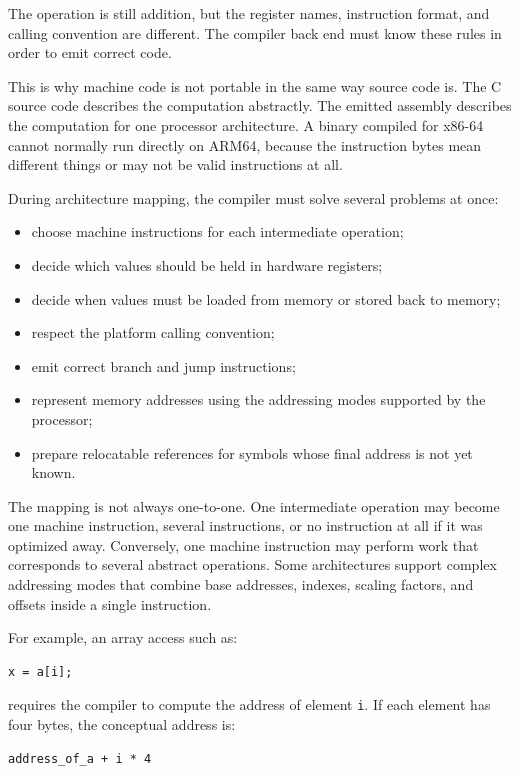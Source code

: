 The operation is still addition, but the register names, instruction format, and calling convention are different. The compiler back end must know these rules in order to emit correct code.

This is why machine code is not portable in the same way source code is. The C source code describes the computation abstractly. The emitted assembly describes the computation for one processor architecture. A binary compiled for x86-64 cannot normally run directly on ARM64, because the instruction bytes mean different things or may not be valid instructions at all.

During architecture mapping, the compiler must solve several problems at once:

\begin{itemize}
    \item choose machine instructions for each intermediate operation;
    \item decide which values should be held in hardware registers;
    \item decide when values must be loaded from memory or stored back to memory;
    \item respect the platform calling convention;
    \item emit correct branch and jump instructions;
    \item represent memory addresses using the addressing modes supported by the processor;
    \item prepare relocatable references for symbols whose final address is not yet known.
\end{itemize}

The mapping is not always one-to-one. One intermediate operation may become one machine instruction, several instructions, or no instruction at all if it was optimized away. Conversely, one machine instruction may perform work that corresponds to several abstract operations. Some architectures support complex addressing modes that combine base addresses, indexes, scaling factors, and offsets inside a single instruction.

For example, an array access such as:

\begin{verbatim}
x = a[i];
\end{verbatim}

requires the compiler to compute the address of element \texttt{i}. If each element has four bytes, the conceptual address is:

\begin{verbatim}
address_of_a + i * 4
\end{verbatim}

